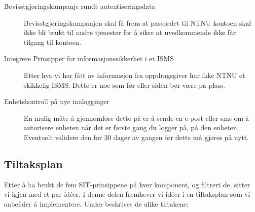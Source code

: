 \begin{description}
\item[Bevisstgjøringskampanje rundt autentiseringsdata]
Bevisstgjøringskampanjen skal få frem at passordet til NTNU kontoen skal ikke bli brukt til andre tjenester for å sikre at uvedkommende ikke får tilgang til kontoen.

\item[Integrere Prinsipper for informasjonssikkerhet i et ISMS]
Etter hva vi har fått av informasjon fra oppdragsgiver har ikke NTNU et skikkelig ISMS. Dette er noe som før eller siden bør være på plass. 

\item[Enhetskontroll på nye innlogginger]
En mulig måte å gjennomføre dette på er å sende en e-post eller sms om å autorisere enheten når det er første gang du logger på, på den enheten. Eventuelt validere den for 30 dager av gangen før dette må gjøres på nytt. 

\end{description}

\subsection{Tiltaksplan}
Etter å ha brukt de fem SIT-prinsippene på hver komponent, og filtrert de, sitter vi igjen med et par idéer. I denne delen fremhever vi idéer i en tiltaksplan som vi anbefaler å implementere. 
Under beskrives de ulike tiltakene:


